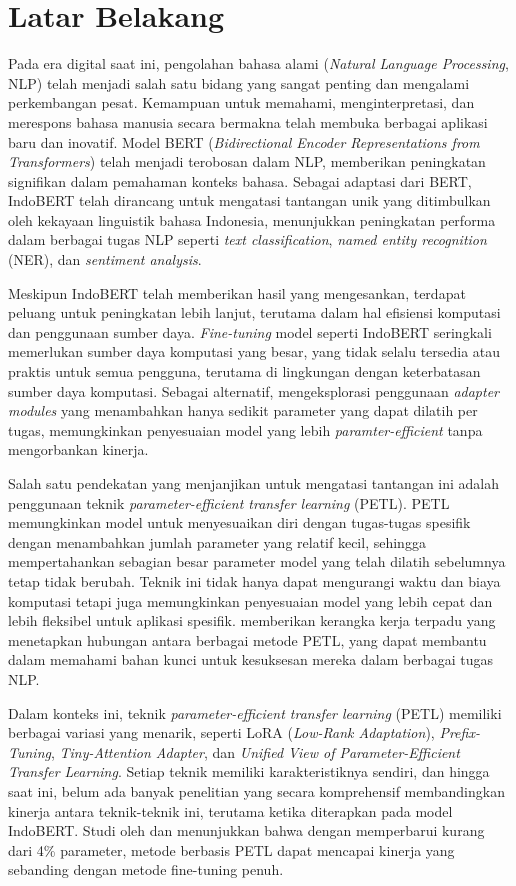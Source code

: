 \section{Latar Belakang}

Pada era digital saat ini, pengolahan bahasa alami (\textit{Natural Language Processing}, NLP) telah menjadi salah satu bidang yang sangat penting dan mengalami perkembangan pesat.  Kemampuan untuk memahami, menginterpretasi, dan merespons bahasa manusia secara bermakna telah membuka berbagai aplikasi baru dan inovatif. Model BERT (\textit{Bidirectional Encoder Representations from Transformers}) telah menjadi terobosan dalam NLP, memberikan peningkatan signifikan dalam pemahaman konteks bahasa. Sebagai adaptasi dari BERT, IndoBERT telah dirancang untuk mengatasi tantangan unik yang ditimbulkan oleh kekayaan linguistik bahasa Indonesia, menunjukkan peningkatan performa dalam berbagai tugas NLP seperti \textit{text classification},  \textit{named entity recognition} (NER), dan \textit{sentiment analysis}.

Meskipun IndoBERT telah memberikan hasil yang mengesankan, terdapat peluang untuk peningkatan lebih lanjut, terutama dalam hal efisiensi komputasi dan penggunaan sumber daya. \textit{Fine-tuning} model seperti IndoBERT seringkali memerlukan sumber daya komputasi yang besar, yang tidak selalu tersedia atau praktis untuk semua pengguna, terutama di lingkungan dengan keterbatasan sumber daya komputasi. Sebagai alternatif, \cite{parameter} mengeksplorasi penggunaan \textit{adapter modules} yang menambahkan hanya sedikit parameter yang dapat dilatih per tugas, memungkinkan penyesuaian model yang lebih \textit{paramter-efficient} tanpa mengorbankan kinerja.

Salah satu pendekatan yang menjanjikan untuk mengatasi tantangan ini adalah penggunaan teknik \textit{parameter-efficient transfer learning} (PETL). PETL memungkinkan model untuk menyesuaikan diri dengan tugas-tugas spesifik dengan menambahkan jumlah parameter yang relatif kecil, sehingga mempertahankan sebagian besar parameter model yang telah dilatih sebelumnya tetap tidak berubah. Teknik ini tidak hanya dapat mengurangi waktu dan biaya komputasi tetapi juga memungkinkan penyesuaian model yang lebih cepat dan lebih fleksibel untuk aplikasi spesifik. \cite{uvpl} memberikan kerangka kerja terpadu yang menetapkan hubungan antara berbagai metode PETL, yang dapat membantu dalam memahami bahan kunci untuk kesuksesan mereka dalam berbagai tugas NLP.

Dalam konteks ini, teknik \textit{parameter-efficient transfer learning} (PETL) memiliki berbagai variasi yang menarik, seperti LoRA (\textit{Low-Rank Adaptation}), \textit{Prefix-Tuning}, \textit{Tiny-Attention Adapter}, dan \textit{Unified View of Parameter-Efficient Transfer Learning}. Setiap teknik memiliki karakteristiknya sendiri, dan hingga saat ini, belum ada banyak penelitian yang secara komprehensif membandingkan kinerja antara teknik-teknik ini, terutama ketika diterapkan pada model IndoBERT. Studi oleh \cite{parameter} dan \cite{uvpl} menunjukkan bahwa dengan memperbarui kurang dari 4\% parameter, metode berbasis PETL dapat mencapai kinerja yang sebanding dengan metode fine-tuning penuh.

